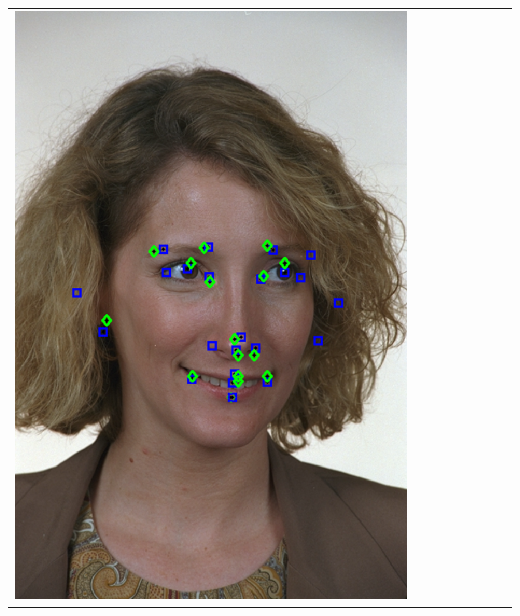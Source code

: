 \documentclass[portrait,final,a0paper,fontscale=0.277]{baposter}
\begin{document}
\begin{poster}
{{\begin{tabular}{@{}rccccccc@{}}
\parbox[c]{0.11\linewidth}{\includegraphics[width=\linewidth]{images/l_qr_success_2.pdf}} &

\end{tabular}}}
\end{poster}
\end{document}
